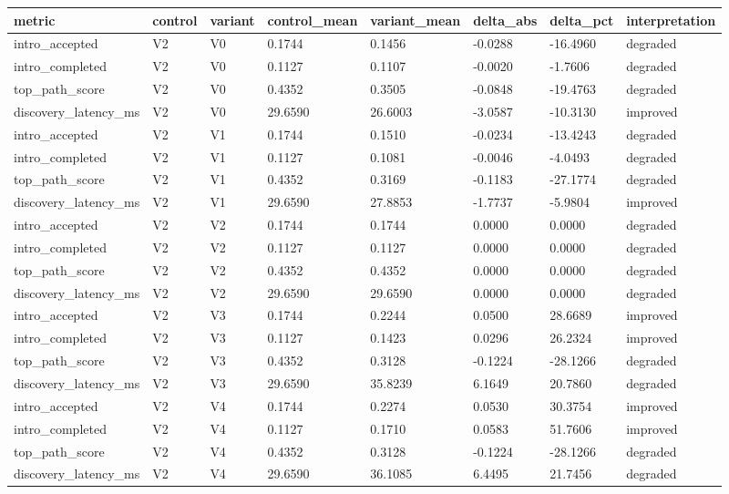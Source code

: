 \begin{tabular}{llllllll}
\toprule
metric & control & variant & control_mean & variant_mean & delta_abs & delta_pct & interpretation \\
\midrule
intro_accepted & V2 & V0 & 0.1744 & 0.1456 & -0.0288 & -16.4960 & degraded \\
intro_completed & V2 & V0 & 0.1127 & 0.1107 & -0.0020 & -1.7606 & degraded \\
top_path_score & V2 & V0 & 0.4352 & 0.3505 & -0.0848 & -19.4763 & degraded \\
discovery_latency_ms & V2 & V0 & 29.6590 & 26.6003 & -3.0587 & -10.3130 & improved \\
intro_accepted & V2 & V1 & 0.1744 & 0.1510 & -0.0234 & -13.4243 & degraded \\
intro_completed & V2 & V1 & 0.1127 & 0.1081 & -0.0046 & -4.0493 & degraded \\
top_path_score & V2 & V1 & 0.4352 & 0.3169 & -0.1183 & -27.1774 & degraded \\
discovery_latency_ms & V2 & V1 & 29.6590 & 27.8853 & -1.7737 & -5.9804 & improved \\
intro_accepted & V2 & V2 & 0.1744 & 0.1744 & 0.0000 & 0.0000 & degraded \\
intro_completed & V2 & V2 & 0.1127 & 0.1127 & 0.0000 & 0.0000 & degraded \\
top_path_score & V2 & V2 & 0.4352 & 0.4352 & 0.0000 & 0.0000 & degraded \\
discovery_latency_ms & V2 & V2 & 29.6590 & 29.6590 & 0.0000 & 0.0000 & degraded \\
intro_accepted & V2 & V3 & 0.1744 & 0.2244 & 0.0500 & 28.6689 & improved \\
intro_completed & V2 & V3 & 0.1127 & 0.1423 & 0.0296 & 26.2324 & improved \\
top_path_score & V2 & V3 & 0.4352 & 0.3128 & -0.1224 & -28.1266 & degraded \\
discovery_latency_ms & V2 & V3 & 29.6590 & 35.8239 & 6.1649 & 20.7860 & degraded \\
intro_accepted & V2 & V4 & 0.1744 & 0.2274 & 0.0530 & 30.3754 & improved \\
intro_completed & V2 & V4 & 0.1127 & 0.1710 & 0.0583 & 51.7606 & improved \\
top_path_score & V2 & V4 & 0.4352 & 0.3128 & -0.1224 & -28.1266 & degraded \\
discovery_latency_ms & V2 & V4 & 29.6590 & 36.1085 & 6.4495 & 21.7456 & degraded \\
\bottomrule
\end{tabular}

